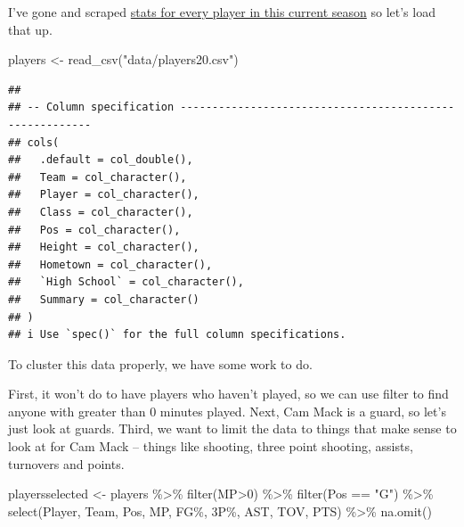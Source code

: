 \documentclass[
]{book}
\newenvironment{Shaded}{\begin{snugshade}}{\end{snugshade}}
\newcommand{\AttributeTok}[1]{\textcolor[rgb]{0.77,0.63,0.00}{#1}}
\newcommand{\DecValTok}[1]{\textcolor[rgb]{0.00,0.00,0.81}{#1}}
\newcommand{\FunctionTok}[1]{\textcolor[rgb]{0.00,0.00,0.00}{#1}}
\newcommand{\NormalTok}[1]{#1}
\newcommand{\OtherTok}[1]{\textcolor[rgb]{0.56,0.35,0.01}{#1}}
\newcommand{\SpecialCharTok}[1]{\textcolor[rgb]{0.00,0.00,0.00}{#1}}
\newcommand{\StringTok}[1]{\textcolor[rgb]{0.31,0.60,0.02}{#1}}
\begin{document}
I've gone and scraped \href{https://unl.box.com/s/0g56ve61y6hakyxzr1u4t534721bqvg8}{stats for every player in this current season} so let's load that up.

\begin{Shaded}
\begin{Highlighting}[]
\NormalTok{players }\OtherTok{\textless{}{-}} \FunctionTok{read\_csv}\NormalTok{(}\StringTok{"data/players20.csv"}\NormalTok{)}
\end{Highlighting}
\end{Shaded}

\begin{verbatim}
## 
## -- Column specification --------------------------------------------------------
## cols(
##   .default = col_double(),
##   Team = col_character(),
##   Player = col_character(),
##   Class = col_character(),
##   Pos = col_character(),
##   Height = col_character(),
##   Hometown = col_character(),
##   `High School` = col_character(),
##   Summary = col_character()
## )
## i Use `spec()` for the full column specifications.
\end{verbatim}

To cluster this data properly, we have some work to do.

First, it won't do to have players who haven't played, so we can use filter to find anyone with greater than 0 minutes played. Next, Cam Mack is a guard, so let's just look at guards. Third, we want to limit the data to things that make sense to look at for Cam Mack -- things like shooting, three point shooting, assists, turnovers and points.

\begin{Shaded}
\begin{Highlighting}[]
\NormalTok{playersselected }\OtherTok{\textless{}{-}}\NormalTok{ players }\SpecialCharTok{\%\textgreater{}\%} 
  \FunctionTok{filter}\NormalTok{(MP}\SpecialCharTok{\textgreater{}}\DecValTok{0}\NormalTok{) }\SpecialCharTok{\%\textgreater{}\%} \FunctionTok{filter}\NormalTok{(Pos }\SpecialCharTok{==} \StringTok{"G"}\NormalTok{) }\SpecialCharTok{\%\textgreater{}\%} 
  \FunctionTok{select}\NormalTok{(Player, Team, Pos, MP, }\StringTok{\textasciigrave{}}\AttributeTok{FG\%}\StringTok{\textasciigrave{}}\NormalTok{, }\StringTok{\textasciigrave{}}\AttributeTok{3P\%}\StringTok{\textasciigrave{}}\NormalTok{, AST, TOV, PTS) }\SpecialCharTok{\%\textgreater{}\%} 
  \FunctionTok{na.omit}\NormalTok{() }
\end{Highlighting}
\end{Shaded}
\end{document}
